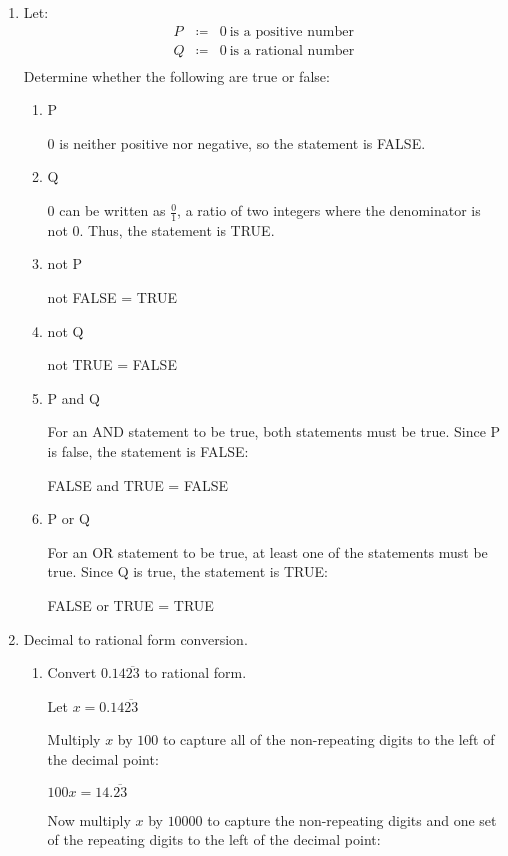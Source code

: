 \documentclass[letterpaper,12pt,fleqn]{article}
\begin{document}
\begin{enumerate}
\item Let:
\begin{eqnarray*}
P &\coloneqq& 0\ \mbox{is a positive number} \\
Q &\coloneqq& 0\ \mbox{is a rational number} \\
\end{eqnarray*}
Determine whether the following are true or false:
\begin{enumerate}
\item P
  
  $0$ is neither positive nor negative, so the statement is FALSE.
  
\item Q

  $0$ can be written as $\frac{0}{1}$, a ratio of two integers where the
  denominator is not $0$. Thus, the statement is TRUE.
  
\item not P

  not FALSE = TRUE
  
\item not Q

  not TRUE = FALSE
  
\item P and Q

  For an AND statement to be true, both statements must be true. Since P is
  false, the statement is FALSE:

  FALSE and TRUE = FALSE

\item P or Q

  For an OR statement to be true, at least one of the statements must be true.
  Since Q is true, the statement is TRUE:

  FALSE or TRUE = TRUE
  
\end{enumerate}
\newpage
\item Decimal to rational form conversion.
\begin{enumerate}
\item Convert $0.14\overline{23}$ to rational form.

  Let $x=0.14\overline{23}$

  Multiply $x$ by $100$ to capture all of the non-repeating digits to the left
  of the decimal point:

  $100x=14.\overline{23}$

  Now multiply $x$ by $10000$ to capture the non-repeating digits and one set
  of the repeating digits to the left of the decimal point:
  

\end{enumerate}
\end{enumerate}
\end{document}
